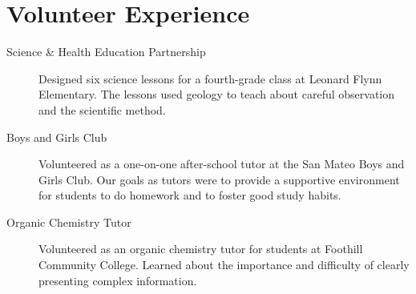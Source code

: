 \documentclass{article}
\begin{document}
 \section*{Volunteer Experience}
  
  \begin{description}
   \item[Science \& Health Education Partnership] Designed six science lessons 
   for a fourth-grade class at Leonard Flynn Elementary.  The lessons used 
   geology to teach about careful observation and the scientific method.  

   \item[Boys and Girls Club] Volunteered as a one-on-one after-school tutor at 
   the San Mateo Boys and Girls Club.  Our goals as tutors were to provide a 
   supportive environment for students to do homework and to foster good study
   habits.
   
   \item[Organic Chemistry Tutor] Volunteered as an organic chemistry tutor for 
   students at Foothill Community College.  Learned about the importance and 
   difficulty of clearly presenting complex information.
  \end{description}



\end{document}

